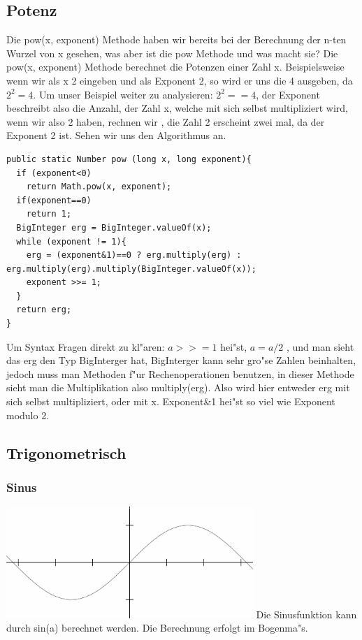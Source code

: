 \documentclass{scrartcl}
\begin{document}
\subsection{Potenz}
Die pow(x, exponent) Methode haben wir bereits bei der Berechnung der n-ten Wurzel von x gesehen, was aber ist die pow Methode und was macht sie?
Die pow(x, exponent) Methode berechnet die Potenzen einer Zahl x. Beispielsweise wenn wir als x 2 eingeben und als Exponent 2, so wird er uns die 4 ausgeben, da \(2^2 = 4\).
Um unser Beispiel weiter zu analysieren: \(2^2 == 4\), der Exponent beschreibt also die Anzahl, der Zahl x, welche mit sich selbst multipliziert wird, wenn wir also 2 haben, rechnen wir , die Zahl 2 erscheint zwei mal, da der Exponent 2 ist. Sehen wir uns den Algorithmus an.
\begin{minipage}{\textwidth}
\begin{lstlisting}
public static Number pow (long x, long exponent){
  if (exponent<0)
    return Math.pow(x, exponent);
  if(exponent==0)
    return 1;
  BigInteger erg = BigInteger.valueOf(x);
  while (exponent != 1){
    erg = (exponent&1)==0 ? erg.multiply(erg) : erg.multiply(erg).multiply(BigInteger.valueOf(x));
    exponent >>= 1;
  }
  return erg;
}
\end{lstlisting}
\end{minipage}
Um Syntax Fragen direkt zu kl"aren: \(a >>= 1\) hei"st, \(a = a/2\) , und man sieht das erg den Typ BigInterger hat, BigInterger kann sehr gro"se Zahlen beinhalten, jedoch muss man Methoden f"ur Rechenoperationen benutzen, in dieser Methode sieht man die Multiplikation also multiply(erg). Also wird hier entweder erg mit sich selbst multipliziert, oder mit x. Exponent\&1 hei"st so viel wie Exponent modulo 2.
\subsection{Trigonometrisch}
\subsubsection{Sinus}
\includegraphics[width=0.7\textwidth]{images/functions/sinus.png}\newline
Die Sinusfunktion kann durch sin(a) berechnet werden. Die Berechnung erfolgt im Bogenma"s.
\end{document}
